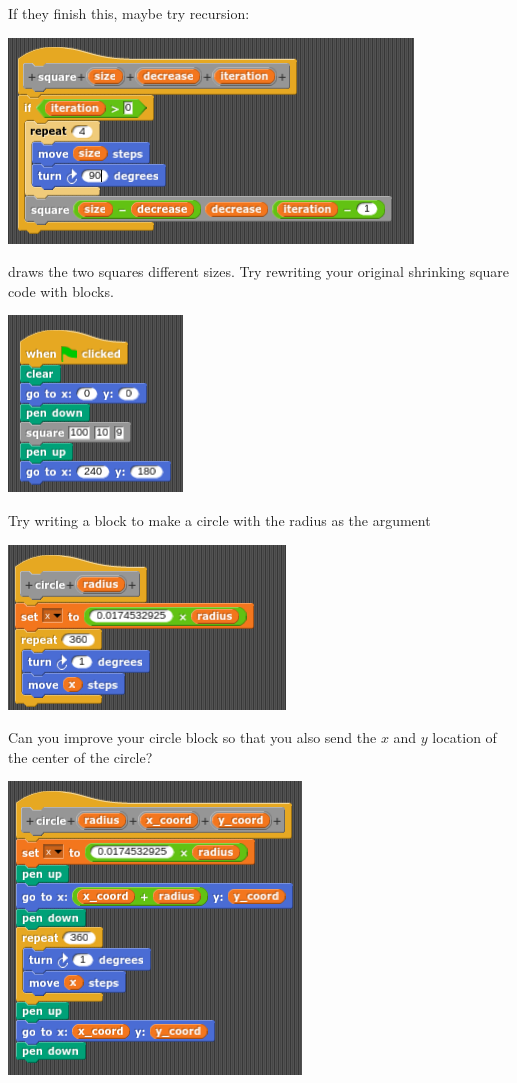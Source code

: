 \documentclass[11pt,a4paper]{scrartcl}
\begin{document}
If they finish this, maybe try recursion:
\begin{center}
\includegraphics{shrinking_square_recursion_block.png}
\end{center}
draws the two squares different sizes.  Try rewriting your original
shrinking square code with blocks.
\begin{center}
\includegraphics{shrinking_square_recursion.png}
\end{center}

Try writing a block to make a circle with the radius as the argument
\begin{center}
\includegraphics{circle_block.png}
\end{center}
Can you improve your circle block so that you also send the $x$ and $y$ location of the center of the circle?
\begin{center}
\includegraphics{centre_circle_block.png}
\end{center}
\end{document}
